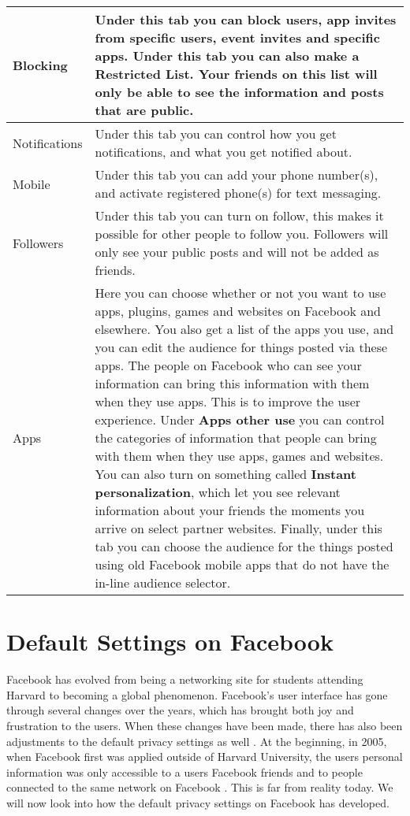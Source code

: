 \begin{center}
\begin{longtable}{ | l | p{9cm} |}
	\hline
    Blocking & Under this tab you can block users, app invites from specific users, event invites and specific apps. Under this tab you can also make a \textbf{Restricted List}. Your friends on this list will only be able to see the information and posts that are public.\\
    \hline
    Notifications & Under this tab you can control how you get notifications, and what you get notified about.\\
    \hline
    Mobile & Under this tab you can add your phone number(s), and activate registered phone(s) for text messaging.\\
    \hline
    Followers & Under this tab you can turn on follow, this makes it possible for other people to follow you. Followers will only see your public posts and will not be added as friends.\\
    \hline
    Apps & Here you can choose whether or not you want to use apps, plugins, games and websites on Facebook and elsewhere. You also get a list of the apps you use, and you can edit the audience for things posted via these apps. The people on Facebook who can see your information can bring this information with them when they use apps. This is to improve the user experience. Under \textbf{Apps other use} you can control the categories of information that people can bring with them when they use apps, games and websites. You can also turn on something called \textbf{Instant personalization}, which let you see relevant information about your friends the moments you arrive on select partner websites. Finally, under this tab you can choose the audience for the things posted using old Facebook mobile apps that do not have the in-line audience selector.\\ 
    \hline
    \end{longtable}
\end{center}



\section{Default Settings on Facebook}\label{sec:default_privacy_settings}

Facebook has evolved from being a networking site for students attending Harvard to becoming a global phenomenon. Facebook's user interface has gone through several changes over the years, which has brought both joy and frustration to the users. When these changes have been made, there has also been adjustments to the default privacy settings as well \cite{EvoPriv2}. At the beginning, in 2005, when Facebook first was applied outside of Harvard University, the users personal information was only accessible to a users Facebook friends and to people connected to the same network on Facebook \cite{EvoPriv}. This is far from reality today. We will now look into how the default privacy settings on Facebook has developed. 


